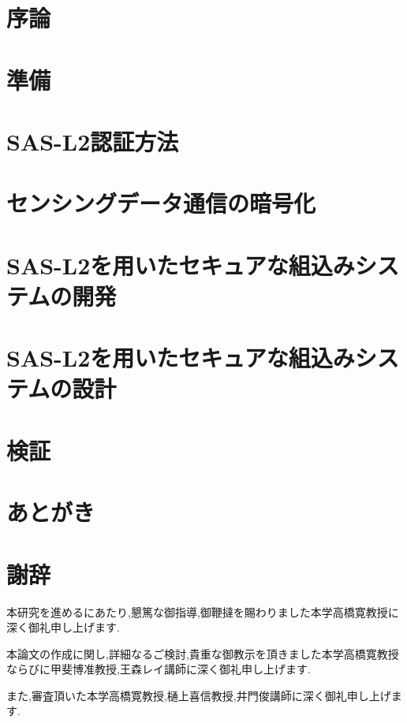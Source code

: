 \documentclass{thesis}
\begin{document}
\tableofcontents
\chapter{序論}


\chapter{準備}


\chapter{SAS-L2認証方法}


\chapter{センシングデータ通信の暗号化}


\chapter{SAS-L2を用いたセキュアな組込みシステムの開発}


\chapter{SAS-L2を用いたセキュアな組込みシステムの設計}


\chapter{検証}


\chapter{あとがき}


\newpage
{}
\chapter*{謝辞}

本研究を進めるにあたり,懇篤な御指導,御鞭撻を賜わりました本学高橋寛教授に深く御礼申し上げます.

本論文の作成に関し,詳細なるご検討,貴重な御教示を頂きました本学高橋寛教授ならびに甲斐博准教授,王森レイ講師に深く御礼申し上げます.

また,審査頂いた本学高橋寛教授,樋上喜信教授,井門俊講師に深く御礼申し上げます.
\end{document}
